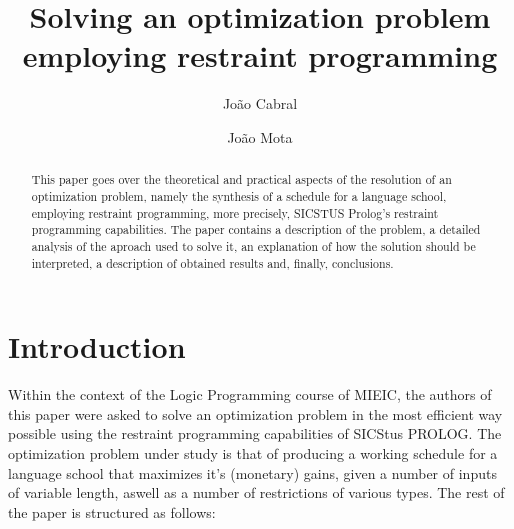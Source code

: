 \documentclass{llncs}
\begin{document}
\tableofcontents
%
%
\title{Solving an optimization problem employing restraint programming}
%
%
\author{João Cabral \and João Mota}
%
%
%

\maketitle              %

\begin{abstract}
This paper goes over the theoretical and practical aspects of the resolution of an optimization problem,
namely the synthesis of a schedule for a language school, employing restraint programming, more precisely, 
SICSTUS Prolog's restraint programming capabilities.
The paper contains a description of the problem, a detailed analysis of the aproach used to solve it, 
an explanation of how the solution should be interpreted, a description of obtained results and, finally, conclusions.

\end{abstract}
%
\section{Introduction}
Within the context of the Logic Programming course of MIEIC, the authors of this paper were asked to solve an optimization problem in the most efficient way possible using the restraint programming capabilities of SICStus PROLOG. The optimization problem under study is that of producing a working schedule for a language school that maximizes it's (monetary) gains,  given a number of inputs of variable length, aswell as a number of restrictions of various types. The rest of the paper is structured as follows:
\end{document}
